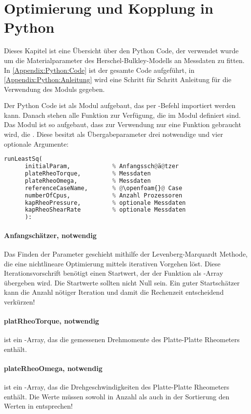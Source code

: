 \section{Optimierung und Kopplung in Python}
\label{Appendix:Python}
Dieses Kapitel ist eine Übersicht über den Python Code, der verwendet wurde um die Materialparameter des Herschel-Bulkley-Modells an Messdaten zu fitten.
In \ref{Appendix:Python:Code} ist der gesamte Code aufgeführt, in \ref{Appendix:Python:Anleitung} wird eine Schritt für Schritt Anleitung für die Verwendung des Moduls gegeben.

Der Python Code ist als Modul aufgebaut, das per -Befehl importiert werden kann.
Danach stehen alle Funktion zur Verfügung, die im Modul definiert sind.
Das Modul ist so aufgebaut, dass zur Verwendung nur eine Funktion gebraucht wird, die .
Diese besitzt als Übergabeparameter drei notwendige und vier optionale Argumente:
\begin{lstlisting}[language=Python]
runLeastSq(
      initialParam,            % Anfangssch@ä@tzer
      plateRheoTorque,         % Messdaten
      plateRheoOmega,          % Messdaten
      referenceCaseName,       % @\openfoam{}@ Case
      numberOfCpus,            % Anzahl Prozessoren
      kapRheoPressure,         % optionale Messdaten
      kapRheoShearRate         % optionale Messdaten
      ):  
\end{lstlisting}
\paragraph{Anfangschätzer, notwendig}
Das Finden der Parameter geschieht mithilfe der Levenberg-Marquardt Methode, die eine nichtlineare Optimierung mittels iterativen Vorgehen löst. Diese Iterationsvorschrift benötigt einen Startwert, der der Funktion  als -Array übergeben wird. Die Startwerte sollten nicht Null sein.
Ein guter Startschätzer kann die Anzahl nötiger Iteration und damit die Rechenzeit entscheidend verkürzen!
%
\paragraph{platRheoTorque, notwendig}
 ist ein -Array, das die gemessenen Drehmomente des Platte-Platte Rheometers enthält.
%
\paragraph{plateRheoOmega, notwendig}
 ist ein -Array, das die Drehgeschwindigkeiten des Platte-Platte Rheometers enthält. Die Werte müssen sowohl in Anzahl als auch in der Sortierung den Werten in  entsprechen!
